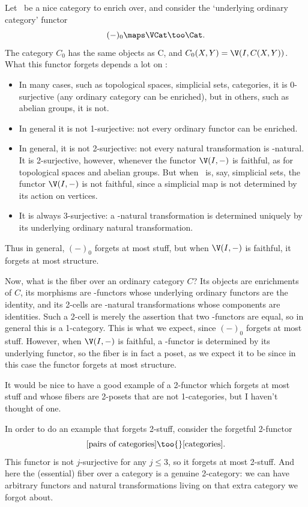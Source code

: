 \documentclass{amsart}
\begin{document}
\begin{eg}
  Let \V\ be a nice category to enrich over, and consider the
  `underlying ordinary category' functor
  \[(-)_0\maps \VCat \too \Cat.\]
  The category $C_0$ has the same objects as C, and $C_0(X,Y) =
  \V(I,C(X,Y))$.  What this functor forgets depends a lot on \V:
  \begin{itemize}
  \item In many cases, such as topological spaces, simplicial sets,
    categories, it is 0-surjective (any ordinary category can be
    enriched), but in others, such as abelian groups, it is not.
  \item In general it is not 1-surjective: not every ordinary functor
    can be enriched.
  \item In general, it is not 2-surjective: not every natural
    transformation is \V-natural.  It is 2-surjective, however,
    whenever the functor $\V(I,-)$ is faithful, as for topological
    spaces and abelian groups.  But when \V\ is, say, simplicial sets,
    the functor $\V(I,-)$ is not faithful, since a simplicial map is
    not determined by its action on vertices.
  \item It is always 3-surjective: a \V-natural transformation is
    determined uniquely by its underlying ordinary natural
    transformation.
  \end{itemize}
  Thus in general, $(-)_0$ forgets at most stuff, but when $\V(I,-)$
  is faithful, it forgets at most structure.

  Now, what is the fiber over an ordinary category $C$?  Its objects
  are enrichments of $C$, its morphisms are \V-functors whose
  underlying ordinary functors are the identity, and its 2-cells are
  \V-natural transformations whose components are identities.  Such a
  2-cell is merely the assertion that two \V-functors are equal, so in
  general this is a 1-category.  This is what we expect, since $(-)_0$
  forgets at most stuff.  However, when $\V(I,-)$ is faithful, a
  \V-functor is determined by its underlying functor, so the fiber is
  in fact a poset, as we expect it to be since in this case the
  functor forgets at most structure.
\end{eg}

It would be nice to have a good example of a 2-functor which forgets
at most stuff and whose fibers are 2-posets that are not 1-categories,
but I haven't thought of one.

\begin{eg}
  In order to do an example that forgets 2-stuff, consider the
  forgetful 2-functor
  \[[\text{pairs of categories}]\too{} [\text{categories}].\]
  This functor is not $j$-surjective for any $j\le 3$, so it forgets
  at most 2-stuff.  And here the (essential) fiber over a category
  is a genuine 2-category: we can have arbitrary functors and natural
  transformations living on that extra category we forgot about.
\end{eg}
\end{document}
